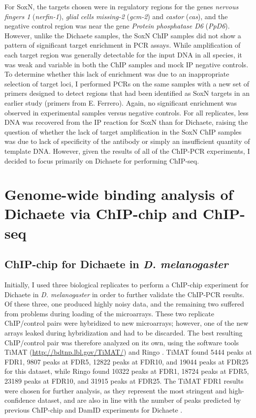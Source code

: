 For SoxN, the targets chosen were in regulatory regions for the genes \emph{nervous fingers 1} (\emph{nerfin-1}), \emph{glial cells missing-2} (\emph{gcm-2}) and \emph{castor} (\emph{cas}), and the negative control region was near the gene \emph{Protein phosphatase D6} (\emph{PpD6}). However, unlike the Dichaete samples, the SoxN ChIP samples did not show a pattern of significant target enrichment in PCR assays. While amplification of each target region was generally detectable for the input DNA in all species, it was weak and variable in both the ChIP samples and mock IP negative controls. To determine whether this lack of enrichment was due to an inappropriate selection of target loci, I performed PCRs on the same samples with a new set of primers designed to detect regions that had been identified as SoxN targets in an earlier study \citep{girard_chromatin_2006} (primers from E. Ferrero). Again, no significant enrichment was observed in experimental samples versus negative controls. For all replicates, less DNA was recovered from the IP reaction for SoxN than for Dichaete, raising the question of whether the lack of target amplification in the SoxN ChIP samples was due to lack of specificity of the antibody or simply an insufficient quantity of template DNA. However, given the results of all of the ChIP-PCR experiments, I decided to focus primarily on Dichaete for performing ChIP-seq.

\section{Genome-wide binding analysis of Dichaete via ChIP-chip and ChIP-seq}
\subsection{ChIP-chip for Dichaete in \emph{D. melanogaster}}
Initially, I used three biological replicates to perform a ChIP-chip experiment for Dichaete in \emph{D. melanogaster} in order to further validate the ChIP-PCR results. Of these three, one produced highly noisy data, and the remaining two suffered from problems during loading of the microarrays. These two replicate ChIP/control pairs were hybridized to new microarrays; however, one of the new arrays leaked during hybridization and had to be discarded. The best resulting ChIP/control pair was therefore analyzed on its own, using the software tools TiMAT (\url{http://bdtnp.lbl.gov/TiMAT/}) and Ringo \citep{toedling_ringor/bioconductor_2007}. TiMAT found 5444 peaks at FDR1, 9807 peaks at FDR5, 12822 peaks at FDR10, and 19044 peaks at FDR25 for this dataset, while Ringo found 10322 peaks at FDR1, 18724 peaks at FDR5, 23189 peaks at FDR10, and 31915 peaks at FDR25. The TiMAT FDR1 results were chosen for further analysis, as they represent the most stringent and high-confidence dataset, and are also in line with the number of peaks predicted by previous ChIP-chip and DamID experiments for Dichaete \citep{aleksic_role_2013}.\\


